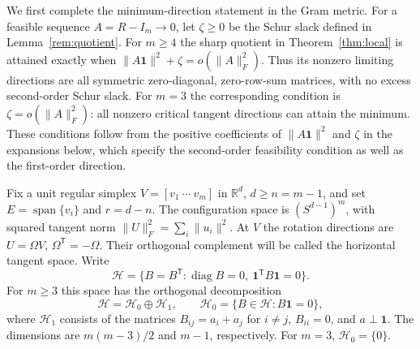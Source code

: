 \documentclass[11pt]{article}
\theoremstyle{remark}\newtheorem{remark}[theorem]{Remark}
\newcommand{\R}{\mathbb R}
\newcommand{\one}{\mathbf 1}
\newcommand{\diag}{\operatorname{diag}}
\begin{document}
We first complete the minimum-direction statement in the Gram metric.
For a feasible sequence $A=R-I_m\to0$, let $\zeta\ge0$ be the Schur slack
defined in Lemma~\ref{rem:quotient}. For $m\ge4$ the sharp quotient in
Theorem~\ref{thm:local} is attained exactly when
$\|A\one\|^2+\zeta=o(\|A\|_F^2)$. Thus its nonzero limiting directions
are all symmetric zero-diagonal, zero-row-sum matrices, with no excess
second-order Schur slack. For $m=3$ the corresponding condition is
$\zeta=o(\|A\|_F^2)$: all nonzero critical tangent directions can attain
the minimum. These conditions follow from the positive coefficients of
$\|A\one\|^2$ and $\zeta$ in the expansions below, which specify the
second-order feasibility condition as well as the first-order direction.

Fix a unit regular simplex $V=[v_1\ \cdots\ v_m]$ in $\R^d$, $d\ge n=m-1$,
and set $E=\operatorname{span}\{v_i\}$ and $r=d-n$.  The configuration space
is $(S^{d-1})^m$, with squared tangent norm $\|U\|_F^2=\sum_i\|u_i\|^2$.
At $V$ the rotation directions are $U=\Omega V$, $\Omega^{\mathsf T}=-\Omega$.
Their orthogonal complement will be called the horizontal tangent space.
Write
\[
 \mathcal H=\{B=B^{\mathsf T}:\diag B=0,\ \one^{\mathsf T}B\one=0\}.
\]
For $m\ge3$ this space has the orthogonal decomposition
\[
 \mathcal H=\mathcal H_0\oplus\mathcal H_1,\qquad
 \mathcal H_0=\{B\in\mathcal H:B\one=0\},
\]
where $\mathcal H_1$ consists of the matrices
$B_{ij}=a_i+a_j$ for $i\ne j$, $B_{ii}=0$, and $a\perp\one$.
The dimensions are $m(m-3)/2$ and $m-1$, respectively. For $m=3$, $\mathcal H_0=
\{0\}$.
\end{document}
